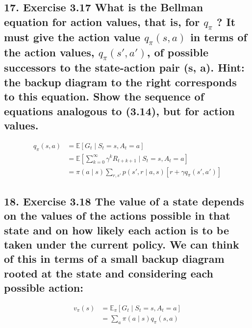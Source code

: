 \subsection*{17. Exercise 3.17 What is the Bellman equation for action values, that is, for $q_\pi$ ? It must give the action value $q_\pi(s, a)$ in terms of the action values, $q_\pi(s' , a' )$, of possible successors to the state-action pair (s, a). Hint: the backup diagram to the right corresponds to this equation. Show the sequence of equations analogous to (3.14), but for action values.}
\begin{align*}
q_\pi(s ,a) &= \mathbb{E}[G_t \mid S_t = s, A_t = a] \\
&= \mathbb{E}[\sum_{k=0}^\infty \gamma^k R_{t+k+1} \mid S_t =s, A_t = a] \\
&= \pi (a \mid s) \sum_{r, s'} p(s', r \mid a, s)[r + \gamma q_\pi (s', a')]
\end{align*}

\subsection*{18. Exercise 3.18 The value of a state depends on the values of the actions possible in that state and on how likely each action is to be taken under the current policy. We can think of this in terms of a small backup diagram rooted at the state and considering each possible action:}
\begin{align*}
v_\pi(s) &= \mathbb{E}_\pi [G_t \mid S_t=s, A_t = a] \\
&= \sum_a \pi(a \mid s)q_\pi(s, a)
\end{align*}

